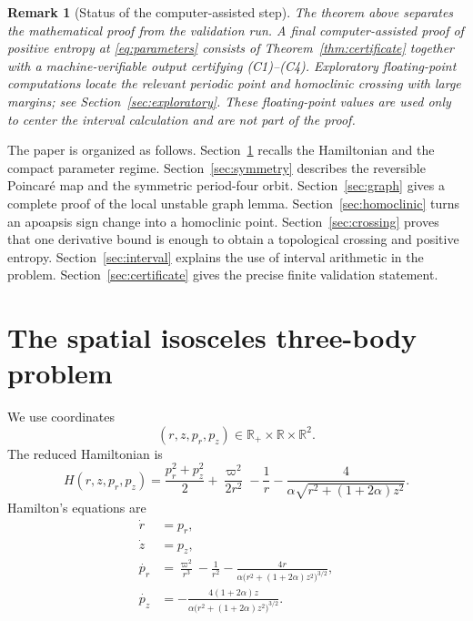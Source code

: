 \documentclass[11pt]{article}
\newtheorem{remark}[theorem]{Remark}
\newcommand{\R}{\mathbb R}
\newcommand{\pr}{p_r}
\newcommand{\pz}{p_z}
\begin{document}
\begin{remark}[Status of the computer-assisted step]\label{rem:status}
The theorem above separates the mathematical proof from the validation run.
A final computer-assisted proof of positive entropy at
\eqref{eq:parameters} consists of Theorem~\ref{thm:certificate} together
with a machine-verifiable output certifying \textnormal{(C1)--(C4)}.
Exploratory floating-point computations locate the relevant periodic point
and homoclinic crossing with large margins; see
Section~\ref{sec:exploratory}.  These floating-point values are used only to
center the interval calculation and are not part of the proof.
\end{remark}

The paper is organized as follows.  Section~\ref{sec:model} recalls the
Hamiltonian and the compact parameter regime.  Section~\ref{sec:symmetry}
describes the reversible Poincar\'e map and the symmetric period-four orbit.
Section~\ref{sec:graph} gives a complete proof of the local unstable graph
lemma.  Section~\ref{sec:homoclinic} turns an apoapsis sign change into a
homoclinic point.  Section~\ref{sec:crossing} proves that one derivative
bound is enough to obtain a topological crossing and positive entropy.
Section~\ref{sec:interval} explains the use of interval arithmetic in the
problem.  Section~\ref{sec:certificate} gives the precise finite validation
statement.

\section{The spatial isosceles three-body problem}\label{sec:model}

We use coordinates
\[
 (r,z,\pr,\pz)\in \R_+\times\R\times\R^2.
\]
The reduced Hamiltonian is
\begin{equation}\label{eq:H}
 H(r,z,\pr,\pz)
 =
 \frac{\pr^2+\pz^2}{2}
 +\frac{\varpi^2}{2r^2}
 -\frac1r
 -\frac{4}{\alpha\sqrt{r^2+(1+2\alpha)z^2}}.
\end{equation}
Hamilton's equations are
\begin{equation}\label{eq:HamEq}
\begin{aligned}
 \dot r&=\pr,\\
 \dot z&=\pz,\\
 \dot{\pr}
 &=
 \frac{\varpi^2}{r^3}
 -\frac1{r^2}
 -\frac{4r}
 {\alpha\bigl(r^2+(1+2\alpha)z^2\bigr)^{3/2}},\\
 \dot{\pz}
 &=
 -\frac{4(1+2\alpha)z}
 {\alpha\bigl(r^2+(1+2\alpha)z^2\bigr)^{3/2}}.
\end{aligned}
\end{equation}
\end{document}
